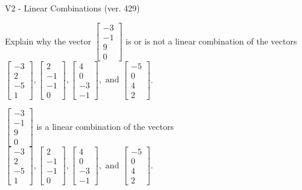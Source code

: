 \begin{exercise}
  \begin{exerciseTitle}V2 - Linear Combinations (ver. 429)\end{exerciseTitle}
  \begin{exerciseStatement}
    Explain why the vector \(\left[\begin{array}{c}
-3 \\
-1 \\
9 \\
0
\end{array}\right]\)  is or is not a linear 
	combination of the vectors \(\left[\begin{array}{c}
-3 \\
2 \\
-5 \\
1
\end{array}\right] , \left[\begin{array}{c}
2 \\
-1 \\
-1 \\
0
\end{array}\right] , \left[\begin{array}{c}
4 \\
0 \\
-3 \\
-1
\end{array}\right] , \text{ and } \left[\begin{array}{c}
-5 \\
0 \\
4 \\
2
\end{array}\right]\).
	


  \end{exerciseStatement}
  \begin{exerciseAnswer}
   \(\left[\begin{array}{c}
-3 \\
-1 \\
9 \\
0
\end{array}\right]\) 
  	 is  
	a linear combination of the vectors \(\left[\begin{array}{c}
-3 \\
2 \\
-5 \\
1
\end{array}\right] , \left[\begin{array}{c}
2 \\
-1 \\
-1 \\
0
\end{array}\right] , \left[\begin{array}{c}
4 \\
0 \\
-3 \\
-1
\end{array}\right] , \text{ and } \left[\begin{array}{c}
-5 \\
0 \\
4 \\
2
\end{array}\right]\).


\end{exerciseAnswer}
\end{exercise}
